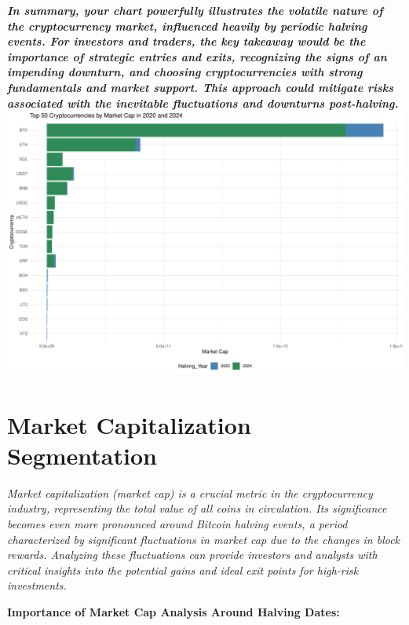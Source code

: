 \documentclass[
]{article}
\begin{document}
\textbf{\emph{In summary, your chart powerfully illustrates the volatile
nature of the cryptocurrency market, influenced heavily by periodic
halving events. For investors and traders, the key takeaway would be the
importance of strategic entries and exits, recognizing the signs of an
impending downturn, and choosing cryptocurrencies with strong
fundamentals and market support. This approach could mitigate risks
associated with the inevitable fluctuations and downturns
post-halving.}}
\includegraphics{Crypto_ETL_files/figure-latex/combined_halving_data top50_2020-1.pdf}

\hypertarget{market-capitalization-segmentation}{%
\section{Market Capitalization
Segmentation}\label{market-capitalization-segmentation}}

\emph{Market capitalization (market cap) is a crucial metric in the
cryptocurrency industry, representing the total value of all coins in
circulation. Its significance becomes even more pronounced around
Bitcoin halving events, a period characterized by significant
fluctuations in market cap due to the changes in block rewards.
Analyzing these fluctuations can provide investors and analysts with
critical insights into the potential gains and ideal exit points for
high-risk investments.}

\textbf{Importance of Market Cap Analysis Around Halving Dates:}
\end{document}
